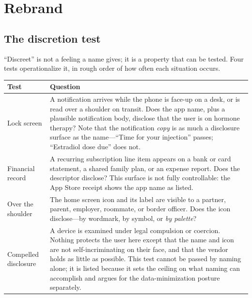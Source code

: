 \documentclass[11pt,a4paper]{article}
\begin{document}
\section{Rebrand}
\label{sec:rebrand}

\subsection{The discretion test}
\label{sec:discretion}

``Discreet'' is not a feeling a name gives; it is a property that can be
tested. Four tests operationalize it, in rough order of how often each
situation occurs.

\begin{longtable}{@{}L{3.2cm}L{11.9cm}@{}}
\toprule
\textbf{Test} & \textbf{Question} \\
\midrule
\endhead
Lock screen &
A notification arrives while the phone is face-up on a desk, or is read
over a shoulder on transit. Does the app name, plus a plausible
notification body, disclose that the user is on hormone therapy?
Note that the notification \emph{copy} is as much a disclosure surface
as the name---``Time for your injection'' passes; ``Estradiol dose
due'' does not. \\[0.4em]

Financial record &
A recurring subscription line item appears on a bank or card statement,
a shared family plan, or an expense report. Does the descriptor
disclose? This surface is not fully controllable: the App Store
receipt shows the app name as listed. \\[0.4em]

Over the shoulder &
The home screen icon and its label are visible to a partner, parent,
employer, roommate, or border officer. Does the icon disclose---by
wordmark, by symbol, or \emph{by palette}? \\[0.4em]

Compelled disclosure &
A device is examined under legal compulsion or coercion. Nothing
protects the user here except that the name and icon are not
self-incriminating on their face, and that the vendor holds as little
as possible. This test cannot be passed by naming alone; it is listed
because it sets the ceiling on what naming can accomplish and argues
for the data-minimization posture separately. \\
\bottomrule
\end{longtable}
\end{document}
